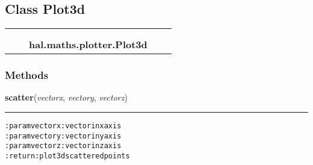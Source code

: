 

\subsection{Class Plot3d}

    \label{hal:maths:plotter:Plot3d}
\begin{tabular}{cccccc}
\multicolumn{2}{r}{\settowidth{\BCL}{object}\multirow{2}{\BCL}{object}}
&&
  \\\cline{3-3}
  &&\multicolumn{1}{c|}{}
&&
  \\
&&\multicolumn{2}{l}{\textbf{hal.maths.plotter.Plot3d}}
\end{tabular}



  \subsubsection{Methods}

    \label{hal:maths:plotter:Plot3d:scatter}

    \vspace{0.5ex}

\hspace{.8\funcindent}\begin{boxedminipage}{\funcwidth}

    \raggedright \textbf{scatter}(\textit{vectorx}, \textit{vectory}, \textit{vectorz})

    \vspace{-1.5ex}

    \rule{\textwidth}{0.5\fboxrule}
\setlength{\parskip}{2ex}
\begin{alltt}

:param vectorx: vector in x axis
:param vectory: vector in y axis
:param vectorz: vector in z axis
:return: plot 3d scattered points
\end{alltt}

\setlength{\parskip}{1ex}
    \end{boxedminipage}


